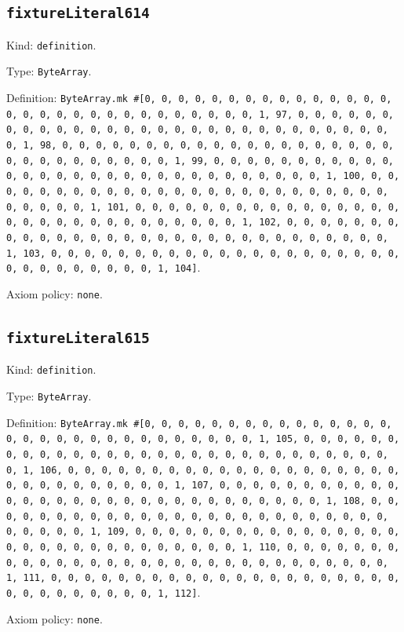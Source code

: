 \documentclass[11pt]{article}
\begin{document}
\subsection*{\texttt{fixtureLiteral614}}
\noindent Kind: \texttt{definition}.\par
\noindent Type: \texttt{ByteArray}.\par
\noindent Definition: \texttt{ByteArray.mk \#[0, 0, 0, 0, 0, 0, 0, 0, 0, 0, 0, 0, 0, 0, 0, 0, 0, 0, 0, 0, 0, 0, 0, 0, 0, 0, 0, 0, 0, 0, 1, 97, 0, 0, 0, 0, 0, 0, 0, 0, 0, 0, 0, 0, 0, 0, 0, 0, 0, 0, 0, 0, 0, 0, 0, 0, 0, 0, 0, 0, 0, 0, 1, 98, 0, 0, 0, 0, 0, 0, 0, 0, 0, 0, 0, 0, 0, 0, 0, 0, 0, 0, 0, 0, 0, 0, 0, 0, 0, 0, 0, 0, 0, 0, 1, 99, 0, 0, 0, 0, 0, 0, 0, 0, 0, 0, 0, 0, 0, 0, 0, 0, 0, 0, 0, 0, 0, 0, 0, 0, 0, 0, 0, 0, 0, 0, 1, 100, 0, 0, 0, 0, 0, 0, 0, 0, 0, 0, 0, 0, 0, 0, 0, 0, 0, 0, 0, 0, 0, 0, 0, 0, 0, 0, 0, 0, 0, 0, 1, 101, 0, 0, 0, 0, 0, 0, 0, 0, 0, 0, 0, 0, 0, 0, 0, 0, 0, 0, 0, 0, 0, 0, 0, 0, 0, 0, 0, 0, 0, 0, 1, 102, 0, 0, 0, 0, 0, 0, 0, 0, 0, 0, 0, 0, 0, 0, 0, 0, 0, 0, 0, 0, 0, 0, 0, 0, 0, 0, 0, 0, 0, 0, 1, 103, 0, 0, 0, 0, 0, 0, 0, 0, 0, 0, 0, 0, 0, 0, 0, 0, 0, 0, 0, 0, 0, 0, 0, 0, 0, 0, 0, 0, 0, 0, 1, 104]}.\par
\noindent Axiom policy: \texttt{none}.\par
\subsection*{\texttt{fixtureLiteral615}}
\noindent Kind: \texttt{definition}.\par
\noindent Type: \texttt{ByteArray}.\par
\noindent Definition: \texttt{ByteArray.mk \#[0, 0, 0, 0, 0, 0, 0, 0, 0, 0, 0, 0, 0, 0, 0, 0, 0, 0, 0, 0, 0, 0, 0, 0, 0, 0, 0, 0, 0, 0, 1, 105, 0, 0, 0, 0, 0, 0, 0, 0, 0, 0, 0, 0, 0, 0, 0, 0, 0, 0, 0, 0, 0, 0, 0, 0, 0, 0, 0, 0, 0, 0, 1, 106, 0, 0, 0, 0, 0, 0, 0, 0, 0, 0, 0, 0, 0, 0, 0, 0, 0, 0, 0, 0, 0, 0, 0, 0, 0, 0, 0, 0, 0, 0, 1, 107, 0, 0, 0, 0, 0, 0, 0, 0, 0, 0, 0, 0, 0, 0, 0, 0, 0, 0, 0, 0, 0, 0, 0, 0, 0, 0, 0, 0, 0, 0, 1, 108, 0, 0, 0, 0, 0, 0, 0, 0, 0, 0, 0, 0, 0, 0, 0, 0, 0, 0, 0, 0, 0, 0, 0, 0, 0, 0, 0, 0, 0, 0, 1, 109, 0, 0, 0, 0, 0, 0, 0, 0, 0, 0, 0, 0, 0, 0, 0, 0, 0, 0, 0, 0, 0, 0, 0, 0, 0, 0, 0, 0, 0, 0, 1, 110, 0, 0, 0, 0, 0, 0, 0, 0, 0, 0, 0, 0, 0, 0, 0, 0, 0, 0, 0, 0, 0, 0, 0, 0, 0, 0, 0, 0, 0, 0, 1, 111, 0, 0, 0, 0, 0, 0, 0, 0, 0, 0, 0, 0, 0, 0, 0, 0, 0, 0, 0, 0, 0, 0, 0, 0, 0, 0, 0, 0, 0, 0, 1, 112]}.\par
\noindent Axiom policy: \texttt{none}.\par
\end{document}
